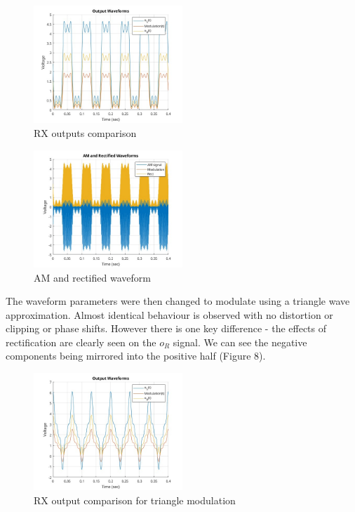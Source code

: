 \documentclass[a4paper, twocolumn]{article}
\begin{document}
        \begin{figure}[htbp]
        \centering

        \includegraphics[width=0.5\textwidth]{Images/AM_RX_1/Square Wave/Output Waveforms.jpg}
        \caption{RX outputs comparison}

        \end{figure}

        \begin{figure}[htbp]
        \centering

        \includegraphics[width=0.5\textwidth]{Images/AM_RX_1/Square Wave/AM and Rectified Waveforms.jpg}
        \caption{AM and rectified waveform}

        \end{figure}

        \newpage

        The waveform parameters were then changed to modulate using a triangle wave approximation. Almost identical behaviour is observed with no distortion or clipping or phase shifts. However there is one key difference - the effects of rectification are clearly seen on the $o_R$ signal. We can see the negative components being mirrored into the positive half (Figure 8).

        \begin{figure}[htbp]
        \centering

        \includegraphics[width=0.5\textwidth]{Images/AM_RX_1/Triangular Wave/Output Waveforms.jpg}
        \caption{RX output comparison for triangle modulation}

        \end{figure}
\end{document}

